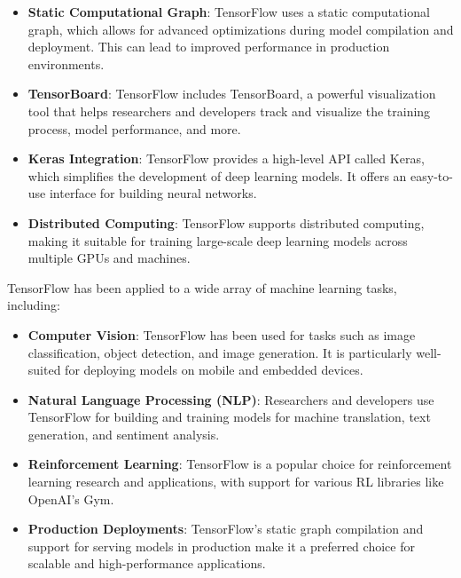 \begin{itemize}
    \item \textbf{Static Computational Graph}: TensorFlow uses a static computational graph, which allows for advanced optimizations during model compilation and deployment. This can lead to improved performance in production environments.
    
    \item \textbf{TensorBoard}: TensorFlow includes TensorBoard, a powerful visualization tool that helps researchers and developers track and visualize the training process, model performance, and more.
    
    \item \textbf{Keras Integration}: TensorFlow provides a high-level API called Keras, which simplifies the development of deep learning models. It offers an easy-to-use interface for building neural networks.
    
    \item \textbf{Distributed Computing}: TensorFlow supports distributed computing, making it suitable for training large-scale deep learning models across multiple GPUs and machines.
\end{itemize}

TensorFlow has been applied to a wide array of machine learning tasks, including:

\begin{itemize}
    \item \textbf{Computer Vision}: TensorFlow has been used for tasks such as image classification, object detection, and image generation. It is particularly well-suited for deploying models on mobile and embedded devices.
    
    \item \textbf{Natural Language Processing (NLP)}: Researchers and developers use TensorFlow for building and training models for machine translation, text generation, and sentiment analysis.
    
    \item \textbf{Reinforcement Learning}: TensorFlow is a popular choice for reinforcement learning research and applications, with support for various RL libraries like OpenAI's Gym.
    
    \item \textbf{Production Deployments}: TensorFlow's static graph compilation and support for serving models in production make it a preferred choice for scalable and high-performance applications.
\end{itemize}

